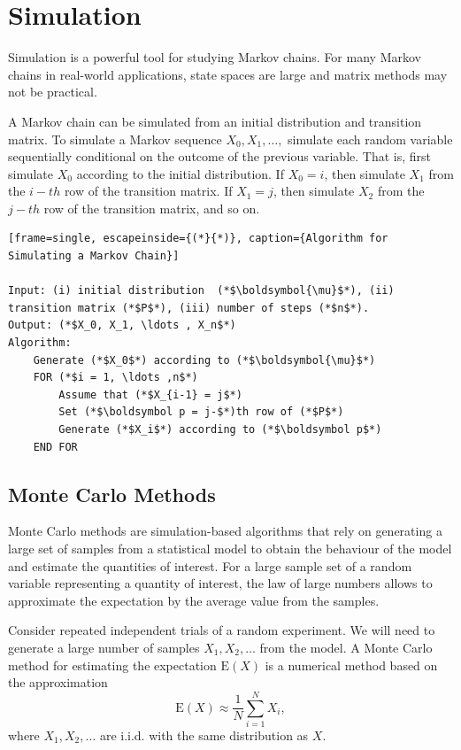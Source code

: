 \documentclass[
]{book}
\theoremstyle{definition}
\theoremstyle{definition}
\theoremstyle{definition}
\theoremstyle{definition}
\theoremstyle{remark}
\begin{document}
\hypertarget{simulation}{%
\chapter{Simulation}\label{simulation}}

Simulation is a powerful tool for studying Markov chains. For many
Markov chains in real-world applications, state spaces are large and
matrix methods may not be practical.

A Markov chain can be simulated from an initial distribution and
transition matrix. To simulate a Markov sequence \(X_0,X_1, \ldots,\)
simulate each random variable sequentially conditional on the outcome of
the previous variable. That is, first simulate \(X_0\) according to the
initial distribution. If \(X_0 = i\), then simulate \(X_1\) from the \(i-th\)
row of the transition matrix. If \(X_1 = j\), then simulate \(X_2\) from the
\(j-th\) row of the transition matrix, and so on.

\begin{verbatim}
[frame=single, escapeinside={(*}{*)}, caption={Algorithm for Simulating a Markov Chain}]

Input: (i) initial distribution  (*$\boldsymbol{\mu}$*), (ii) transition matrix (*$P$*), (iii) number of steps (*$n$*).
Output: (*$X_0, X_1, \ldots , X_n$*)
Algorithm:
    Generate (*$X_0$*) according to (*$\boldsymbol{\mu}$*)
    FOR (*$i = 1, \ldots ,n$*)
        Assume that (*$X_{i-1} = j$*)
        Set (*$\boldsymbol p = j-$*)th row of (*$P$*)
        Generate (*$X_i$*) according to (*$\boldsymbol p$*)
    END FOR
\end{verbatim}

\hypertarget{monte-carlo-methods}{%
\section{Monte Carlo Methods}\label{monte-carlo-methods}}

Monte Carlo methods are simulation-based algorithms that rely on
generating a large set of samples from a statistical model to obtain the
behaviour of the model and estimate the quantities of interest. For a
large sample set of a random variable representing a quantity of
interest, the law of large numbers allows to approximate the expectation
by the average value from the samples.

Consider repeated independent trials of a random experiment. We will
need to generate a large number of samples \(X_1, X_2, \ldots\) from the
model. A Monte Carlo method for estimating the expectation
\(\mathrm{E}( X )\) is a numerical method based on the approximation
\[\mathrm{E}(X) \approx \frac{1}{N}\sum_{i=1}^N X_i,\] where
\(X_1, X_2, \ldots\) are i.i.d. with the same distribution as \(X\).
\end{document}
